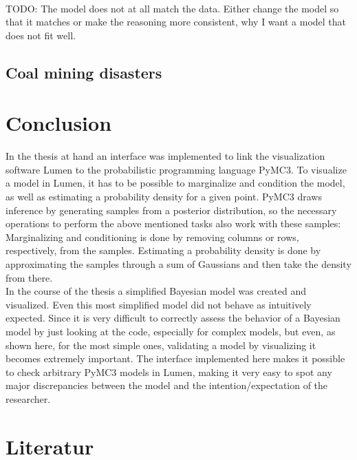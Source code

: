 \documentclass{article}
\begin{document}
\\
TODO: The model does not at all match the data. Either change the model so that it matches or make the reasoning more consistent, why I want a model that does not fit well.
\subsection{Coal mining disasters}



\section {Conclusion}
In the thesis at hand an interface was implemented to link the visualization software Lumen to the probabilistic programming language PyMC3. To visualize a model in Lumen, it has to be possible to marginalize and condition the model, as well as estimating a probability density for a given point. PyMC3 draws inference by generating samples from a posterior distribution, so the necessary operations to perform the above mentioned tasks also work with these samples: Marginalizing and conditioning is done by removing columns or rows, respectively, from the samples. Estimating a probability density is done by approximating the samples through a sum of Gaussians and then take the density from there.\\
In the course of the thesis a simplified Bayesian model was created and visualized. Even this most simplified model did not behave as intuitively expected. Since it is very difficult to correctly assess the behavior of a Bayesian model by just looking at the code, especially for complex models, but even, as shown here, for the most simple ones, validating a model by visualizing it becomes extremely important. The interface implemented here makes it possible to check arbitrary PyMC3 models in Lumen, making it very easy to spot any major discrepancies between the model and the intention/expectation of the researcher.
\listoffigures
        
\section{Literatur}



\end{document}
